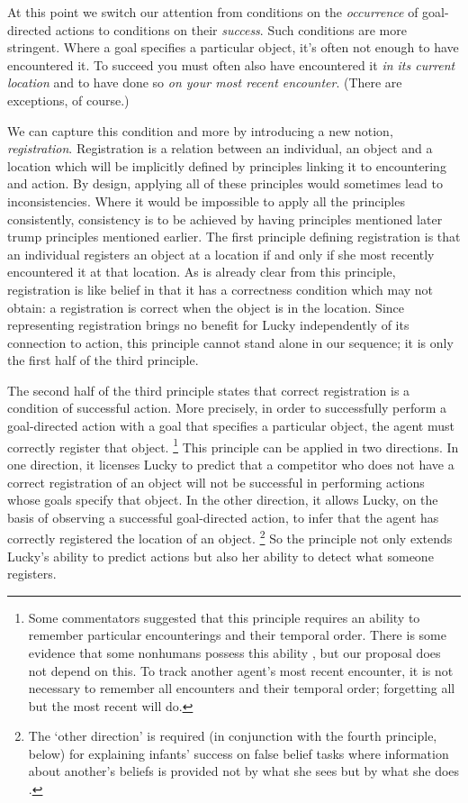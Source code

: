 \documentclass[12pt,\papersize]{extarticle}
\begin{document}
At this point we switch our attention from conditions on the \textit{occurrence} of goal-directed actions to conditions on their \textit{success}.  Such conditions are more stringent.  Where a goal specifies a particular object, it’s often not enough to have encountered it.  To succeed you must often also have encountered it \textit{in its current location} and to have done so \textit{on your most recent encounter}.  
(There are exceptions, of course.)

We can capture this condition and more by introducing a new notion, \textit{registration}.  Registration is a relation between an individual, an object and a location which will be implicitly defined by principles linking it to encountering and action.  
By design, applying all of these principles would sometimes lead to inconsistencies.  
Where it would be impossible to apply all the principles consistently, consistency is to be achieved by having principles mentioned later trump principles mentioned earlier.
The first  principle defining registration is that an individual registers an object at a location if and only if she most recently encountered it at that location.  As is already clear from this principle, registration is like belief in that it has a correctness condition which may not obtain: a registration is correct when the object is in the location.   Since representing registration brings no benefit for Lucky independently of its connection to action, this principle cannot stand alone in our sequence; it is only the first half of the third principle.

The second half of the third principle states that correct registration is a condition of successful action.  More precisely, in order to successfully perform a goal-directed action with a goal that specifies a particular object, the agent must correctly register that object.%
\footnote{ 	
Some commentators suggested that this principle requires an ability to remember particular encounterings and their temporal order.  There is some evidence that some nonhumans possess this ability \citep[e.g.][]{en_1714, en_1715}, but our proposal does not depend on this.  To track another agent’s most recent encounter, it is not necessary to remember all encounters and their temporal order; forgetting all but the most recent will do.
}  
This principle can be applied in two directions.  In one direction, it licenses Lucky to predict that a competitor who does not have a correct registration of an object will not be successful in performing actions whose goals specify that object.  In the other direction, it allows Lucky, on the basis of observing a successful goal-directed action, to infer that the agent has correctly registered the location of an object.%
\footnote{ 	
The ‘other direction’ is required (in conjunction with the fourth principle, below) for explaining infants’ success on false belief tasks where information about another’s beliefs is provided not by what she sees but by what she does \citep[as in][]{en_1824}.
}
So the principle not only extends Lucky’s ability to predict actions but also her ability to detect what someone registers.  
\end{document}
